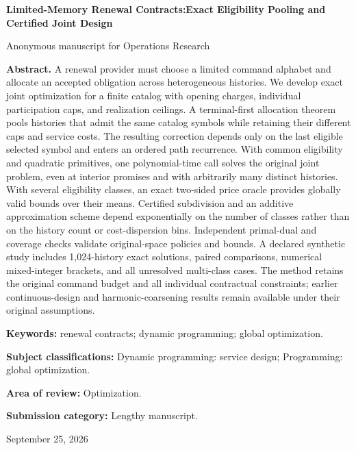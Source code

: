 \documentclass[11pt,letterpaper]{article}
\theoremstyle{definition}\newtheorem{assumption}[theorem]{Assumption}
\begin{document}
\hypersetup{pageanchor=false}
\begin{titlepage}\centering
{\Large\bfseries Limited-Memory Renewal Contracts:\newline Exact Eligibility Pooling and Certified Joint Design\par}
\vspace{.3in}Anonymous manuscript for Operations Research\par\vspace{.2in}
\begin{minipage}{\textwidth}\textbf{Abstract.} A renewal provider must choose a limited command alphabet and allocate an accepted obligation across heterogeneous histories. We develop exact joint optimization for a finite catalog with opening charges, individual participation caps, and realization ceilings. A terminal-first allocation theorem pools histories that admit the same catalog symbols while retaining their different caps and service costs. The resulting correction depends only on the last eligible selected symbol and enters an ordered path recurrence. With common eligibility and quadratic primitives, one polynomial-time call solves the original joint problem, even at interior promises and with arbitrarily many distinct histories. With several eligibility classes, an exact two-sided price oracle provides globally valid bounds over their means. Certified subdivision and an additive approximation scheme depend exponentially on the number of classes rather than on the history count or cost-dispersion bins. Independent primal-dual and coverage checks validate original-space policies and bounds. A declared synthetic study includes 1,024-history exact solutions, paired comparisons, numerical mixed-integer brackets, and all unresolved multi-class cases. The method retains the original command budget and all individual contractual constraints; earlier continuous-design and harmonic-coarsening results remain available under their original assumptions.
\par\vspace{.15in}\textbf{Keywords:} renewal contracts; dynamic programming; global optimization.
\par\vspace{.1in}\textbf{Subject classifications:} Dynamic programming: service design; Programming: global optimization.
\par\vspace{.1in}\textbf{Area of review:} Optimization.
\par\vspace{.1in}\textbf{Submission category:} Lengthy manuscript.
\end{minipage}\vfill September 25, 2026\end{titlepage}
\end{document}
